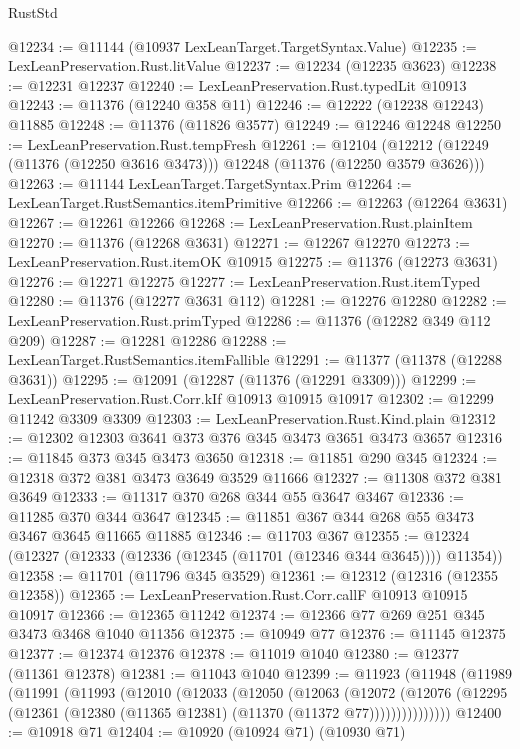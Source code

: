 \begin{lexlean}{RustStd}
\begin{coremodule}
{{{{{{{{{{{{{{{{{{{@12234 := @11144 (@10937 LexLeanTarget.TargetSyntax.Value)
@12235 := LexLeanPreservation.Rust.litValue
@12237 := @12234 (@12235 @3623)
@12238 := @12231 @12237
@12240 := LexLeanPreservation.Rust.typedLit @10913
@12243 := @11376 (@12240 @358 @11)
@12246 := @12222 (@12238 @12243) @11885
@12248 := @11376 (@11826 @3577)
@12249 := @12246 @12248
@12250 := LexLeanPreservation.Rust.tempFresh
@12261 := @12104
    (@12212 (@12249 (@11376 (@12250 @3616 @3473))) @12248 (@11376 (@12250 @3579 @3626)))
@12263 := @11144 LexLeanTarget.TargetSyntax.Prim
@12264 := LexLeanTarget.RustSemantics.itemPrimitive
@12266 := @12263 (@12264 @3631)
@12267 := @12261 @12266
@12268 := LexLeanPreservation.Rust.plainItem
@12270 := @11376 (@12268 @3631)
@12271 := @12267 @12270
@12273 := LexLeanPreservation.Rust.itemOK @10915
@12275 := @11376 (@12273 @3631)
@12276 := @12271 @12275
@12277 := LexLeanPreservation.Rust.itemTyped
@12280 := @11376 (@12277 @3631 @112)
@12281 := @12276 @12280
@12282 := LexLeanPreservation.Rust.primTyped
@12286 := @11376 (@12282 @349 @112 @209)
@12287 := @12281 @12286
@12288 := LexLeanTarget.RustSemantics.itemFallible
@12291 := @11377 (@11378 (@12288 @3631))
@12295 := @12091 (@12287 (@11376 (@12291 @3309)))
@12299 := LexLeanPreservation.Rust.Corr.kIf @10913 @10915 @10917
@12302 := @12299 @11242 @3309 @3309
@12303 := LexLeanPreservation.Rust.Kind.plain
@12312 := @12302 @12303 @3641 @373 @376 @345 @3473 @3651 @3473 @3657
@12316 := @11845 @373 @345 @3473 @3650
@12318 := @11851 @290 @345
@12324 := @12318 @372 @381 @3473 @3649 @3529 @11666
@12327 := @11308 @372 @381 @3649
@12333 := @11317 @370 @268 @344 @55 @3647 @3467
@12336 := @11285 @370 @344 @3647
@12345 := @11851 @367 @344 @268 @55 @3473 @3467 @3645 @11665 @11885
@12346 := @11703 @367
@12355 := @12324 (@12327 (@12333 (@12336 (@12345 (@11701 (@12346 @344 @3645)))) @11354))
@12358 := @11701 (@11796 @345 @3529)
@12361 := @12312 (@12316 (@12355 @12358))
@12365 := LexLeanPreservation.Rust.Corr.callF @10913 @10915 @10917
@12366 := @12365 @11242
@12374 := @12366 @77 @269 @251 @345 @3473 @3468 @1040 @11356
@12375 := @10949 @77
@12376 := @11145 @12375
@12377 := @12374 @12376
@12378 := @11019 @1040
@12380 := @12377 (@11361 @12378)
@12381 := @11043 @1040
@12399 := @11923
    (@11948
      (@11989
        (@11991
          (@11993
            (@12010
              (@12033
                (@12050
                  (@12063
                    (@12072
                      (@12076
                        (@12295 (@12361 (@12380 (@11365 @12381) (@11370 (@11372 @77)))))))))))))))
@12400 := @10918 @71
@12404 := @10920 (@10924 @71) (@10930 @71)
}}}}}}}}}}}}}}}}}}}
\end{coremodule}
\end{lexlean}
